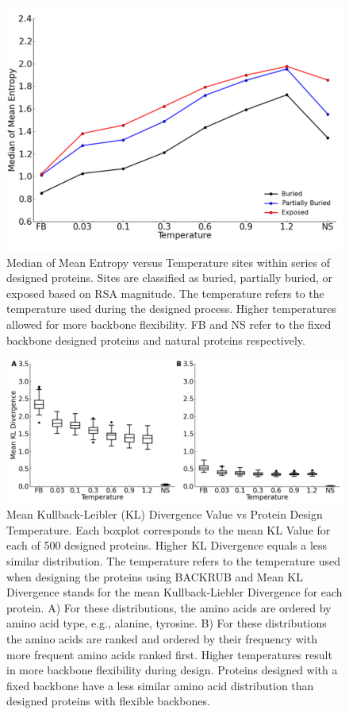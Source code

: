 \documentclass[12pt]{article}
\begin{document}
\begin{figure}[H]
\centerline{\includegraphics[width = 6in]{figures/Mean_Entropy_Position_Lineplot.png}}
\caption{Median of Mean Entropy versus Temperature sites within series of designed proteins.  Sites are classified as buried, partially buried, or exposed based on RSA magnitude. The temperature refers to the temperature used during the designed process. Higher temperatures allowed for more backbone flexibility. FB and NS refer to the fixed backbone designed proteins and natural proteins respectively.}
\label{Duncan_Position_Entropy}
\end{figure}
 

\begin{figure}[H]
\centerline{\includegraphics[width = 6in]{figures/Mean_KL_vs_Temp_Boxplot.png}}
\caption{Mean Kullback-Leibler (KL) Divergence Value vs Protein Design Temperature. Each boxplot corresponds to the mean KL Value for each of 500 designed proteins. Higher KL Divergence  equals a less similar distribution. The temperature refers to the temperature used when designing the proteins using BACKRUB and Mean KL Divergence stands for the mean Kullback-Liebler Divergence for each protein.  A) For these distributions, the amino acids are ordered by amino acid type, e.g., alanine, tyrosine. B) For these distributions the amino acids are ranked and ordered by their frequency with more frequent amino acids ranked first. Higher temperatures result in more backbone flexibility during design. Proteins designed with a fixed backbone have a less similar amino acid distribution than designed proteins with flexible backbones.}
\label{AADisFig1}
\end{figure}
\end{document}
